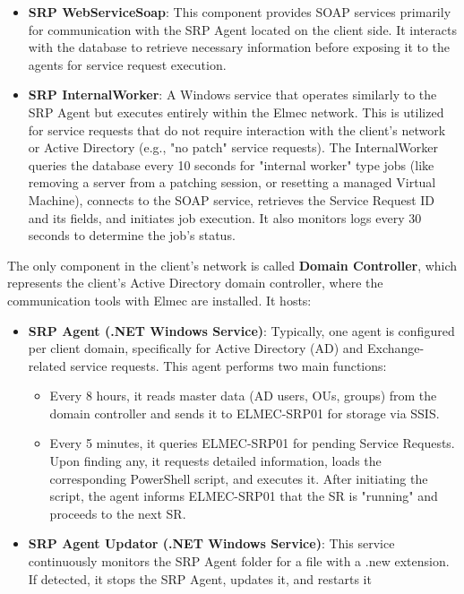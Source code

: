 \begin{itemize}
    \begin{itemize}
        \item \textbf{SRP WebServiceSoap}: This component provides SOAP services primarily for communication with the SRP Agent located on the client side. It interacts with the database to retrieve necessary information before exposing it to the agents for service request execution.
        \item \textbf{SRP InternalWorker}: A Windows service that operates similarly to the SRP Agent but executes entirely within the Elmec network. This is utilized for service requests that do not require interaction with the client's network or Active Directory (e.g., "no patch" service requests). The InternalWorker queries the database every 10 seconds for "internal worker" type jobs (like removing a server from a patching session, or resetting a managed Virtual Machine), connects to the SOAP service, retrieves the Service Request ID and its fields, and initiates job execution. It also monitors logs every 30 seconds to determine the job's status.
    \end{itemize}
\end{itemize}

The only component in the client's network is called \textbf{Domain Controller}, which represents the client's Active Directory domain controller, where the communication tools with Elmec are installed. It hosts:
\begin{itemize}
    \item \textbf{SRP Agent (.NET Windows Service)}: Typically, one agent is configured per client domain, specifically for Active Directory (AD) and Exchange-related service requests. This agent performs two main functions:
    \begin{itemize}
        \item Every 8 hours, it reads master data (AD users, OUs, groups) from the domain controller and sends it to ELMEC-SRP01 for storage via SSIS.
        \item Every 5 minutes, it queries ELMEC-SRP01 for pending Service Requests. Upon finding any, it requests detailed information, loads the corresponding PowerShell script, and executes it. After initiating the script, the agent informs ELMEC-SRP01 that the SR is "running" and proceeds to the next SR.
    \end{itemize}
    
    \item \textbf{SRP Agent Updator (.NET Windows Service)}: This service continuously monitors the SRP Agent folder for a file with a .new extension. If detected, it stops the SRP Agent, updates it, and restarts it
\end{itemize}

